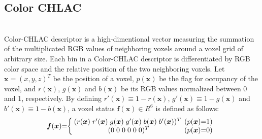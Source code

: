 \documentclass[conference]{sty/IEEEtran}
\begin{document}
\subsection{Color CHLAC}
\\
Color-CHLAC descriptor is a high-dimentional vector measuring the summation of the multiplicated RGB values of neighboring voxels around a voxel grid of arbitrary size. 
Each bin in a Color-CHLAC descriptor is differentiated by RGB color space and the relative position of the two neighboring voxels. 
Let $\bm{x}=(x,y,z)^T$ be the position of a voxel, $p(\bm{x})$ be the flag for occupancy of the voxel, 
 and $r(\bm{x})$, $g(\bm{x})$ and $b(\bm{x})$ be its RGB values normalized between 0 and 1, respectively. 
By defining $r'(\bm{x}) \equiv 1 - r(\bm{x})$, $g'(\bm{x}) \equiv 1 - g(\bm{x})$ and $b'(\bm{x}) \equiv 1 - b(\bm{x})$, 
    a voxel status $\bm{f}(\bm{x})\in R^6$ is defined as follows: 
\begin{eqnarray*}
  \label{eq:voxel}
  \bm{f}({\bm x})\hspace{-1mm}=\hspace{-1mm}\left\{
  \begin{array}{cc}
    \hspace{-1mm}
    (r({\bm x})\hspace{1mm} r'({\bm x}) \hspace{1mm}g({\bm x}) \hspace{1mm}g'({\bm x}) \hspace{1mm}b({\bm x}) \hspace{1mm}b'({\bm x}))^T & \hspace{-2mm}(p({\bm x})\hspace{-1mm}=\hspace{-1mm}1) \\
    (0\hspace{1mm}0\hspace{1mm}0\hspace{1mm}0\hspace{1mm}0\hspace{1mm}0)^T & \hspace{-2mm}(p({\bm x})\hspace{-1mm}=\hspace{-1mm}0)
  \end{array}\right.
\end{eqnarray*}
%
\end{document}
